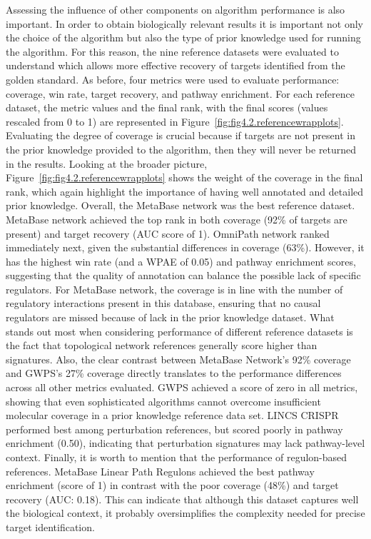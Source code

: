 Assessing the influence of other components on algorithm performance is also important. In order to obtain biologically relevant results it is important not only the choice of the algorithm but also the type of prior knowledge used for running the algorithm. For this reason, the nine reference datasets were evaluated to understand which allows more effective recovery of targets identified from the golden standard. As before, four metrics were used to evaluate performance: coverage, win rate, target recovery, and pathway enrichment. For each reference dataset, the metric values and the final rank, with the final scores (values rescaled from 0 to 1) are represented in Figure~\ref{fig:fig4.2.referencewrapplots}. Evaluating the degree of coverage is crucial because if targets are not present in the prior knowledge provided to the algorithm, then they will never be returned in the results. Looking at the broader picture, Figure~\ref{fig:fig4.2.referencewrapplots} shows the weight of the coverage in the final rank,  which again highlight the importance of having well annotated and detailed prior knowledge. Overall, the MetaBase network was the best reference dataset. MetaBase network achieved the top rank in both coverage (92\% of targets are present) and target recovery (\gls{AUC} score of 1). OmniPath network ranked immediately next, given the substantial differences in coverage (63\%).  However, it has the highest win rate (and a WPAE of 0.05) and pathway enrichment scores, suggesting that the quality of annotation can balance the possible lack of specific regulators. For MetaBase network, the coverage is in line with the number of regulatory interactions present in this database, ensuring that no causal regulators are missed because of lack in the prior knowledge dataset. What stands out most when considering performance of different reference datasets is the fact that topological network references generally score higher than signatures. Also, the clear contrast between MetaBase Network's 92\% coverage and GWPS's 27\% coverage directly translates to the performance differences across all other metrics evaluated. GWPS achieved a score of zero in all metrics, showing that even sophisticated algorithms cannot overcome insufficient molecular coverage in a prior knowledge reference data set. LINCS CRISPR performed best among perturbation references, but scored poorly in pathway enrichment (0.50), indicating that perturbation signatures may lack pathway-level context. Finally, it is worth to mention that the performance of regulon-based references. MetaBase Linear Path Regulons achieved the best pathway enrichment (score of 1) in contrast with the poor coverage (48\%) and target recovery (\gls{AUC}: 0.18). This can indicate that although this dataset captures well the biological context, it probably oversimplifies the complexity needed for precise target identification.

